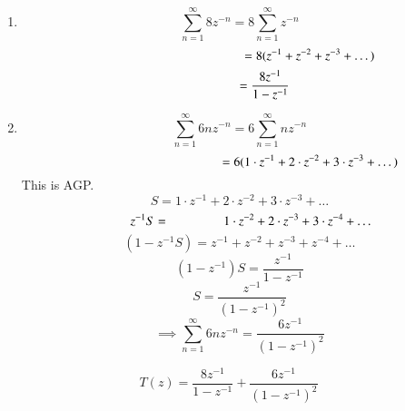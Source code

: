 \documentclass[journal,12pt,twocolumn]{IEEEtran}
\theoremstyle{remark}
\begin{document}
\begin{enumerate}
    \item \[\sum_{n=1}^{\infty} 8z^{-n}=8\sum_{n=1}^{\infty} z^{-n}\]
    \[\hspace{3.9cm}=8(z^{-1}+z^{-2}+z^{-3}+\dots)\]
    \[\hspace{1.4cm}=\frac{8z^{-1}}{1-z^{-1}}\]

    \item \[\sum_{n=1}^{\infty} 6nz^{-n}=6\sum_{n=1}^{\infty}nz^{-n}\]
    \[\hspace{3.9cm}=6(1\cdot z^{-1} + 2\cdot z^{-2} + 3\cdot z^{-3} + \dots)\]
    This is AGP.
    \[S=1\cdot z^{-1}+2\cdot z^{-2}+3\cdot z^{-3}+\dots\]
    \[\hspace{0.7cm}z^{-1}S=\hspace{1.5cm}1\cdot z^{-2}+2\cdot z^{-3}+3\cdot z^{-4}+\dots\]
    \hrulefill
    \[(1-z^{-1}S)=z^{-1}+z^{-2}+z^{-3}+z^{-4}+\dots\]
    \[(1-z^{-1})S=\frac{z^{-1}}{1-z^{-1}}\]
    \[S=\frac{z^{-1}}{(1-z^{-1})^{2}}\]
    \[\implies \sum_{n=1}^{\infty}6nz^{-n}=\frac{6z^{-1}}{(1-z^{-1})^{2}}\]
\end{enumerate}
\vspace{1cm}
\[T(z)=\frac{8z^{-1}}{1-z^{-1}}+\frac{6z^{-1}}{(1-z^{-1})^{2}}\]
\end{document}
